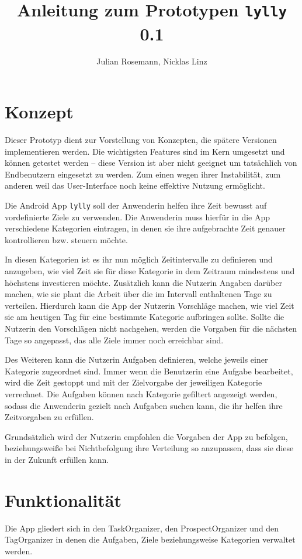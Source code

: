 \documentclass[10pt,a4paper]{article}
\title{\textbf{Anleitung zum Prototypen \texttt{lylly} 0.1}}
\author{Julian Rosemann, Nicklas Linz}
\begin{document}
\maketitle
\section{Konzept}
Dieser Prototyp dient zur Vorstellung von Konzepten, die spätere Versionen implementieren werden. Die wichtigsten Features sind im Kern umgesetzt und können getestet werden – diese Version ist aber nicht geeignet um tatsächlich von Endbenutzern eingesetzt zu werden. Zum einen wegen ihrer Instabilität, zum anderen weil das User-Interface noch keine effektive Nutzung ermöglicht.

Die Android App \texttt{lylly} soll der Anwenderin helfen ihre Zeit bewusst auf vordefinierte Ziele zu verwenden. Die Anwenderin muss hierfür in die App verschiedene Kategorien eintragen, in denen sie ihre aufgebrachte Zeit genauer kontrollieren bzw. steuern möchte.

In diesen Kategorien ist es ihr nun möglich Zeitintervalle zu definieren und anzugeben, wie viel Zeit sie für diese Kategorie in dem Zeitraum mindestens und höchstens investieren möchte. Zusätzlich kann die Nutzerin Angaben darüber machen, wie sie plant die Arbeit über die im Intervall enthaltenen Tage zu verteilen. Hierdurch kann die App der Nutzerin Vorschläge machen, wie viel Zeit sie am heutigen Tag für eine bestimmte Kategorie aufbringen sollte. Sollte die Nutzerin den Vorschlägen nicht nachgehen, werden die Vorgaben für die nächsten Tage so angepasst, das alle Ziele immer noch erreichbar sind.

Des Weiteren kann die Nutzerin Aufgaben definieren, welche jeweils einer Kategorie zugeordnet sind. Immer wenn die Benutzerin eine Aufgabe bearbeitet, wird die Zeit gestoppt und mit der Zielvorgabe der jeweiligen Kategorie verrechnet. Die Aufgaben können nach Kategorie gefiltert angezeigt werden, sodass die Anwenderin gezielt nach Aufgaben suchen kann, die ihr helfen ihre Zeitvorgaben zu erfüllen.

Grundsätzlich wird der Nutzerin empfohlen die Vorgaben der App zu befolgen, beziehungsweiße bei Nichtbefolgung ihre Verteilung so anzupassen, dass sie diese in der Zukunft erfüllen kann.

\section{Funktionalität}
Die App gliedert sich in den TaskOrganizer, den ProspectOrganizer und den TagOrganizer in denen die Aufgaben, Ziele beziehungsweise Kategorien verwaltet werden.
\end{document}
